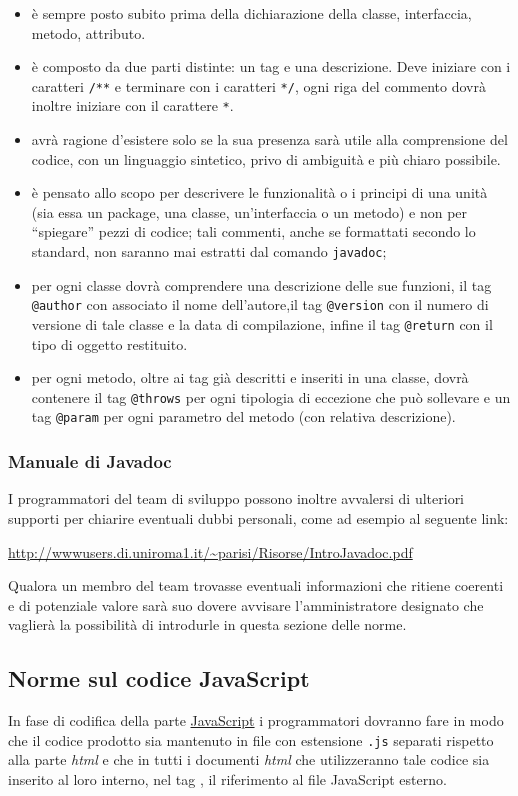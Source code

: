 {\begin{itemize}
	\item è sempre posto subito prima della dichiarazione della classe, interfaccia, metodo, attributo.	
	\item è composto da due parti distinte: un tag e una descrizione. Deve iniziare con i caratteri \verb+/**+ e terminare con i caratteri \verb+*/+, ogni riga del commento dovrà inoltre iniziare con il carattere \verb+*+.
	\item avrà ragione d'esistere solo se la sua presenza sarà utile alla comprensione del codice, con un linguaggio sintetico, privo di ambiguità e più chiaro possibile.
	\item  è pensato allo scopo per descrivere le funzionalità o i principi di una unità (sia essa un package, una classe, un'interfaccia o un metodo) e non per ``spiegare'' pezzi di codice; tali commenti, anche se formattati secondo lo standard, non saranno mai estratti dal comando \texttt{javadoc};
	\item per ogni classe dovrà comprendere una descrizione delle sue funzioni, il tag \verb+@author+ con associato il nome dell'autore,il tag \verb+@version+ con il numero di versione di tale classe e la data di compilazione, infine il tag \verb+@return+ con il tipo di oggetto restituito.
	\item per ogni metodo, oltre ai tag già descritti e inseriti in una classe, dovrà contenere il tag \verb+@throws+ per ogni tipologia di eccezione che può sollevare e un tag \verb+@param+ per ogni parametro del metodo (con relativa descrizione).
\end{itemize}

\subsubsection{Manuale di Javadoc}

I programmatori del team di sviluppo possono inoltre avvalersi di ulteriori supporti per chiarire eventuali dubbi personali, come ad esempio al seguente link:
\begin{center}
\url{http://wwwusers.di.uniroma1.it/~parisi/Risorse/IntroJavadoc.pdf}
\end{center}

Qualora un membro del team trovasse eventuali informazioni che ritiene coerenti e di potenziale valore sarà suo dovere avvisare l'amministratore designato che vaglierà la possibilità di introdurle in questa sezione delle norme.

\subsection{Norme sul codice JavaScript}
In fase di codifica della parte \underline{JavaScript} i programmatori dovranno fare in modo che il codice prodotto sia mantenuto in file con estensione \texttt{.js} separati rispetto alla parte \textit{html} e che in tutti i documenti \textit{html} che utilizzeranno tale codice sia inserito al loro interno, nel tag , il riferimento al file JavaScript esterno.

}
